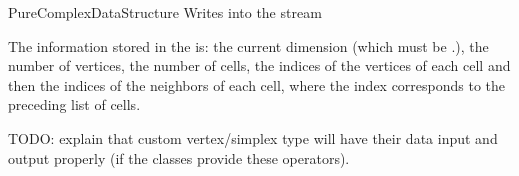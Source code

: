 \begin{ccRefConcept}{PureComplexDataStructure}
{Writes  into the stream }

The information stored in the  is: the current dimension (which
must be \ccc{<=} \ccVar.), the number of vertices,
the number of cells, the indices of the vertices of each cell and then the
indices of the neighbors of each cell, where the index corresponds to the
preceding list of cells.

TODO: explain that custom vertex/simplex type will have their data input and
output properly (if the classes provide these operators).

\ccSeeAlso

\\

\end{ccRefConcept}
